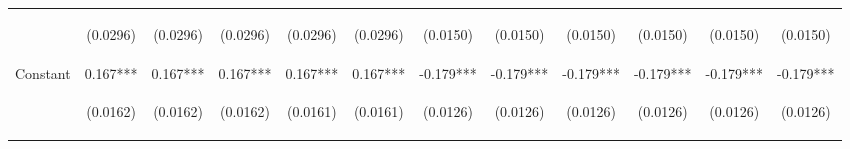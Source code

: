 \documentclass[]{article}
\begin{document}
\begin{center}
\begin{tabular}{lccccccccccc}
\vspace{4pt} & \begin{footnotesize}(0.0296)\end{footnotesize} & \begin{footnotesize}(0.0296)\end{footnotesize} & \begin{footnotesize}(0.0296)\end{footnotesize} & \begin{footnotesize}(0.0296)\end{footnotesize} & \begin{footnotesize}(0.0296)\end{footnotesize} & \begin{footnotesize}(0.0150)\end{footnotesize} & \begin{footnotesize}(0.0150)\end{footnotesize} & \begin{footnotesize}(0.0150)\end{footnotesize} & \begin{footnotesize}(0.0150)\end{footnotesize} & \begin{footnotesize}(0.0150)\end{footnotesize} & \begin{footnotesize}(0.0150)\end{footnotesize} \\
Constant & 0.167*** & 0.167*** & 0.167*** & 0.167*** & 0.167*** & -0.179*** & -0.179*** & -0.179*** & -0.179*** & -0.179*** & -0.179*** \\
 & \begin{footnotesize}(0.0162)\end{footnotesize} & \begin{footnotesize}(0.0162)\end{footnotesize} & \begin{footnotesize}(0.0162)\end{footnotesize} & \begin{footnotesize}(0.0161)\end{footnotesize} & \begin{footnotesize}(0.0161)\end{footnotesize} & \begin{footnotesize}(0.0126)\end{footnotesize} & \begin{footnotesize}(0.0126)\end{footnotesize} & \begin{footnotesize}(0.0126)\end{footnotesize} & \begin{footnotesize}(0.0126)\end{footnotesize} & \begin{footnotesize}(0.0126)\end{footnotesize} & \begin{footnotesize}(0.0126)\end{footnotesize} \\

\end{tabular}
\end{center}
\end{document}
